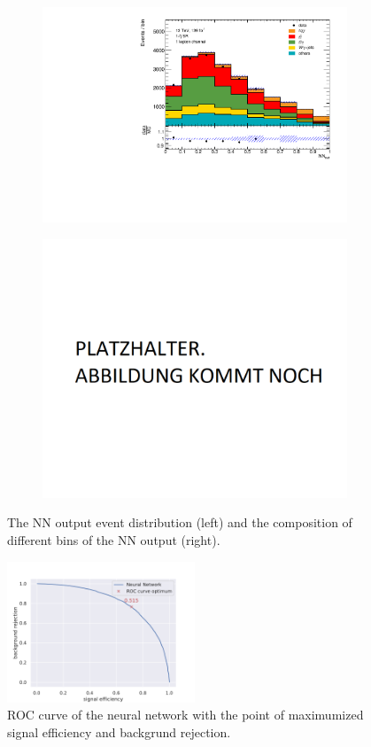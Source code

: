 \begin{figure}
    \centering
    \begin{subfigure}{.5\textwidth}
      \centering
      \includegraphics[width=\linewidth]{Plots/NN_out_mix_GANZ.pdf}
    \end{subfigure}%
    \begin{subfigure}{.5\textwidth}
      \centering
      \includegraphics[width=\linewidth]{Plots/Platzhalter.png}
    \end{subfigure}
    \caption{The NN output event distribution (left) and the composition of different bins of the NN output (right).}
    \label{fig:NNdistro}
\end{figure}
\begin{figure}
    \centering
    \includegraphics[width=0.5\textwidth]{Plots/ROC-Curve-fullt.pdf}
    \caption{ROC curve of the neural network with the point of maximumized signal efficiency and backgrund rejection.}
    \label{fig:rocfull}
\end{figure}